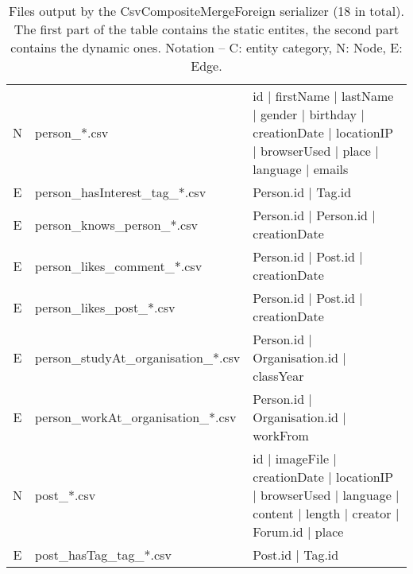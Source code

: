 \begin{table}[htb]
{\begin{tabular}{|c|p{4.3cm}|p{12.4cm}|}
        N                       & person\_*.csv                        & id | firstName | lastName | gender | birthday | creationDate | locationIP | browserUsed | place | language | emails \\
        E                       & person\_hasInterest\_tag\_*.csv      & Person.id | Tag.id                                                                                                  \\
        E                       & person\_knows\_person\_*.csv         & Person.id | Person.id | creationDate                                                                                \\
        E                       & person\_likes\_comment\_*.csv        & Person.id | Post.id | creationDate                                                                                  \\
        E                       & person\_likes\_post\_*.csv           & Person.id | Post.id | creationDate                                                                                  \\
        E                       & person\_studyAt\_organisation\_*.csv & Person.id | Organisation.id | classYear                                                                             \\
        E                       & person\_workAt\_organisation\_*.csv  & Person.id | Organisation.id | workFrom                                                                              \\
        \hline
        N                       & post\_*.csv                          & id | imageFile | creationDate | locationIP | browserUsed | language | content | length | creator | Forum.id | place \\
        E                       & post\_hasTag\_tag\_*.csv             & Post.id | Tag.id                                                                                                    \\
        \hline
    \end{tabular}}
    \caption{Files output by the CsvCompositeMergeForeign serializer (18 in total). The first part of the table contains the static entites, the second part contains the dynamic ones. Notation -- C: entity category, N: Node, E: Edge.}
    \label{table:csv_composite_merge_foreign}
\end{table}
